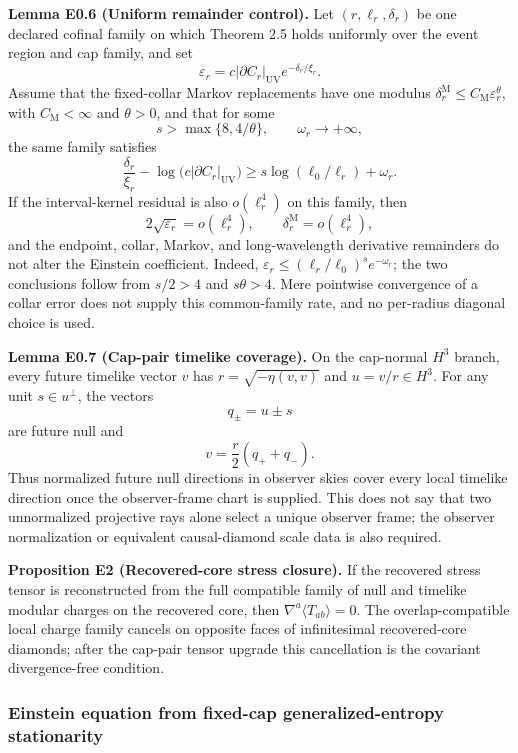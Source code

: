 \textbf{Lemma E0.6 (Uniform remainder control).} Let
\((r,\ell_r,\delta_r)\) be one declared cofinal family on which Theorem 2.5
holds uniformly over the event region and cap family, and set
\[
\varepsilon_r
=c|\partial C_r|_{\mathrm{UV}}e^{-\delta_r/\xi_r}.
\]
Assume that the fixed-collar Markov replacements have one modulus
\(\delta_r^{\mathrm M}\le C_{\mathrm M}\varepsilon_r^\theta\), with
\(C_{\mathrm M}<\infty\) and \(\theta>0\), and that for some
\[
s>\max\{8,4/\theta\},\qquad \omega_r\longrightarrow+\infty,
\]
the same family satisfies
\[
\frac{\delta_r}{\xi_r}
-\log\!\bigl(c|\partial C_r|_{\mathrm{UV}}\bigr)
\ge s\log(\ell_0/\ell_r)+\omega_r.
\]
If the interval-kernel residual is also \(o(\ell_r^4)\) on this family, then
\[
2\sqrt{\varepsilon_r}=o(\ell_r^4),\qquad
\delta_r^{\mathrm M}=o(\ell_r^4),
\]
and the endpoint, collar, Markov, and long-wavelength derivative remainders do
not alter the Einstein coefficient. Indeed,
\(\varepsilon_r\le(\ell_r/\ell_0)^s e^{-\omega_r}\); the two conclusions
follow from \(s/2>4\) and \(s\theta>4\). Mere pointwise convergence of a
collar error does not supply this common-family rate, and no per-radius
diagonal choice is used.

\textbf{Lemma E0.7 (Cap-pair timelike coverage).} On the cap-normal \(H^3\) branch, every future timelike vector \(v\) has \(r=\sqrt{-\eta(v,v)}\) and \(u=v/r\in H^3\). For any unit \(s\in u^\perp\), the vectors
\[
q_\pm=u\pm s
\]
are future null and
\[
v=\frac r2(q_++q_-).
\]
Thus normalized future null directions in observer skies cover every local timelike direction once the observer-frame chart is supplied. This does not say that two unnormalized projective rays alone select a unique observer frame; the observer normalization or equivalent causal-diamond scale data is also required.

\textbf{Proposition E2 (Recovered-core stress closure).} If the recovered stress tensor is reconstructed from the full compatible family of null and timelike modular charges on the recovered core, then \(\nabla^a\langle T_{ab}\rangle=0\). The overlap-compatible local charge family cancels on opposite faces of infinitesimal recovered-core diamonds; after the cap-pair tensor upgrade this cancellation is the covariant divergence-free condition.

\subsubsection{Einstein equation from fixed-cap generalized-entropy stationarity}\label{56-einstein-equation-from-cap-equilibrium}

